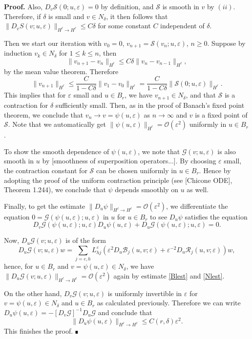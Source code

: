 \documentclass[letterpaper,11pt]{article}
\newcommand{\rmO}{\mathcal{O}}
\newcommand{\eps}{\varepsilon}
\newcommand{\Rm}{\mathcal{R}}
\newcommand{\G}{\mathcal{G}}
\newcommand{\cS}{\mathcal{S}}
\numberwithin{equation}{section}
\theoremstyle{plain}
\theoremstyle{remark}
\newenvironment{Proof}[1][.]%
 {\begin{trivlist}\item[]\textbf{Proof#1 }}%
 {\hspace*{\fill}$\rule{0.3\baselineskip}{0.35\baselineskip}$\end{trivlist}}
\begin{document}
\begin{Proof}
Also, $D_v\cS(0;u,\eps) = 0$ by definition, and $\cS$ is smooth in $v$ by $(ii)$. Therefore, if $\delta$ is small and $v\in N_\delta$, it then follows that $\|D_vS(v;u,\eps)\|_{H^\ell \to H^\ell} \le C\delta$ for some constant $C$ independent of $\delta$.

Then we start our iteration with $v_0 = 0$, $v_{n+1} = \cS(v_n;u,\eps)$, $n\ge 0$. Suppose by induction $v_k \in N_\delta$ for $1\le k \le n$, then
\[
\|v_{n+1}-v_n\|_{H^\ell} \le C\delta\|v_n-v_{n-1}\|_{H^\ell},
\]
by the mean value theorem. Therefore
\[
\|v_{n+1}\|_{H^\ell} \le \frac{C}{1-C\delta}\|v_1-v_0\|_{H^\ell} = \frac{C}{1-C\delta}\|\cS(0;u,\eps)\|_{H^\ell}.
\]
This implies that for $\eps$ small and $u \in B_r$, we have $v_{n+1} \in N_\delta$, and that $\cS$ is a contraction for $\delta$ sufficiently small. Then, as in the proof of Banach's fixed point theorem, we conclude that $v_n \to v = \psi(u,\eps)$ as $n\to \infty$ and $v$ is a fixed point of $\cS$. Note that we automatically get $\|\psi(u,\eps)\|_{H^\ell} = \rmO(\eps^2)$ uniformly in $u\in B_r$. 

To show the smooth dependence of $\psi(u,\eps)$, we note that $\G(v;u,\eps)$ is also smooth in $u$ by [smoothness of superposition operators...]. By choosing $\eps$ small, the contraction constant for $\cS$ can be chosen uniformly in $u \in B_r$. Hence by adopting the proof of the uniform contraction principle (see [Chicone ODE], Theorem 1.244), we conclude that $\psi$ depends smoothly on $u$ as well.

Finally, to get the estimate $\|D_u\psi\|_{H^\ell \to H^\ell} = \rmO(\eps^2)$, we differentiate the equation $0 = \G(\psi(u,\eps);u,\eps)$ in $u$ for $u\in B_r$ to see $D_u\psi$ satisfies the equation
\[
D_v\G(\psi(u,\eps); u,\eps)  D_u\psi(u,\eps) + D_u\G(\psi(u,\eps);u,\eps) = 0.
\]

Now, $D_u\G(v;u,\eps)$ is of the form
\[
D_u\G(v;u,\eps) w =  \sum_{j=c,h} L_{hj}^\eps (\eps^2 D_u \mathcal{B}_j(u,v;\eps) + \eps^{-2} D_u\Rm_j(u,v;\eps) ) w,
\]
hence, for $u \in B_r$ and $v=\psi(u,\eps) \in N_\delta$, we have $\|D_u\G(v;u,\eps)\|_{H^\ell \to H^\ell} = \rmO(\eps^2)$ again by estimate \eqref{Blest} and \eqref{Nlest}.

On the other hand, $D_v\G(v;u,\eps)$ is uniformly invertible in $\eps$ for $v=\psi(u,\eps)\in N_\delta$ and $u\in B_r$ as calculated previously. Therefore we can write $D_u\psi(u,\eps) = -[D_v\G]^{-1} D_u\G $ and conclude that 
\[
\|D_u\psi(u,\eps)\|_{H^\ell \to H^\ell} \le C(r,\delta)\eps^2.
\] This finishes the proof.
\end{Proof}
\end{document}
